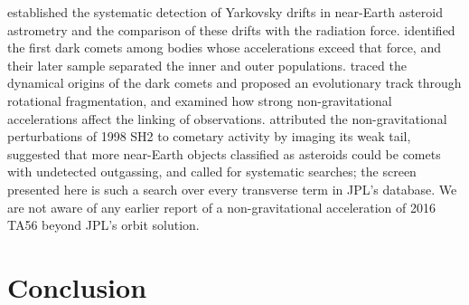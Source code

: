 \documentclass[3p,11pt]{elsarticle}
\begin{document}
\citet{Farnocchia2013} established the systematic detection of
Yarkovsky drifts in near-Earth asteroid astrometry and the comparison of these drifts with
the radiation force. \citet{Seligman2023} identified the first dark comets
among bodies whose accelerations exceed that force, and their later
sample \citep{Seligman2024} separated the inner and outer populations. \citet{Taylor2024a} traced the dynamical origins of the dark comets and proposed an
evolutionary track through rotational fragmentation, and \citet{Taylor2024b}
examined how strong non-gravitational accelerations affect the linking of observations.
\citet{Farnocchia2026} attributed the non-gravitational perturbations of
1998 SH2 to cometary activity by imaging its weak tail, suggested that more near-Earth
objects classified as asteroids could be comets with undetected outgassing, and called
for systematic searches; the screen presented here is such a search over every
transverse term in JPL's database. We are not aware of any earlier report of a
non-gravitational acceleration of 2016 TA56 beyond JPL's orbit solution.

\section{Conclusion}\label{sec:conclusion}
\end{document}
